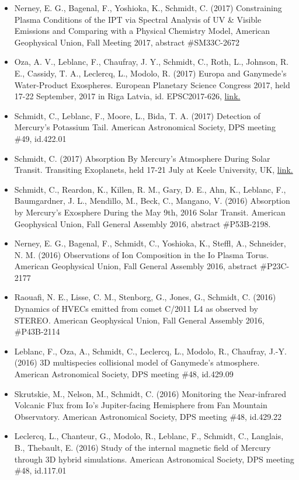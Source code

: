 \documentclass[12pt]{report}
\begin{document}
\begin{itemize}
   \item Nerney, E. G., Bagenal, F., Yoshioka, K., Schmidt, C. (2017) Constraining Plasma Conditions of the IPT via Spectral Analysis of UV \& Visible Emissions and Comparing with a Physical Chemistry Model, American Geophysical Union, Fall Meeting 2017, abstract \#SM33C-2672
   \item Oza, A. V., Leblanc, F., Chaufray, J. Y., Schmidt, C., Roth, L., Johnson, R. E., Cassidy, T. A., Leclercq, L., Modolo, R. (2017) Europa and Ganymede's Water-Product Exospheres. European Planetary Science Congress 2017, held 17-22 September, 2017 in Riga Latvia, id. EPSC2017-626, \href{https://meetingorganizer.copernicus.org/EPSC2017/EPSC2017-626-1.pdf}{link.} 
   \item Schmidt, C., Leblanc, F., Moore, L., Bida, T. A. (2017) Detection of Mercury's Potassium Tail. American Astronomical Society, DPS meeting \#49, id.422.01
   \item Schmidt, C. (2017) Absorption By Mercury's Atmosphere During Solar Transit. Transiting Exoplanets, held 17-21 July at Keele University, UK, \href{https://wasp-planets.net/conference/talk-abstracts/#44}{link.} 
   \item Schmidt, C., Reardon, K., Killen, R. M., Gary, D. E., Ahn, K., Leblanc, F., Baumgardner, J. L., Mendillo, M., Beck, C., Mangano, V. (2016) Absorption by Mercury's Exosphere During the May 9th, 2016 Solar Transit. American Geophysical Union, Fall General Assembly 2016, abstract \#P53B-2198.
   \item Nerney, E. G., Bagenal, F., Schmidt, C., Yoshioka, K., Steffl, A., Schneider, N. M. (2016) Observations of Ion Composition in the Io Plasma Torus. American Geophysical Union, Fall General Assembly 2016, abstract \#P23C-2177
   \item Raouafi, N. E., Lisse, C. M., Stenborg, G., Jones, G., Schmidt, C. (2016) Dynamics of HVECs emitted from comet C/2011 L4 as observed by STEREO. American Geophysical Union, Fall General Assembly 2016, \#P43B-2114
   \item Leblanc, F., Oza, A., Schmidt, C., Leclercq, L., Modolo, R., Chaufray, J.-Y. (2016) 3D multispecies collisional model of Ganymede's atmosphere. American Astronomical Society, DPS meeting \#48, id.429.09
   \item Skrutskie, M., Nelson, M., Schmidt, C. (2016) Monitoring the Near-infrared Volcanic Flux from Io's Jupiter-facing Hemisphere from Fan Mountain Observatory. American Astronomical Society, DPS meeting \#48, id.429.22
   \item Leclercq, L., Chanteur, G., Modolo, R., Leblanc, F., Schmidt, C., Langlais, B., Thebault, E. (2016) Study of the internal magnetic field of Mercury through 3D hybrid simulations. American Astronomical Society, DPS meeting \#48, id.117.01

\end{itemize}
\end{document}
